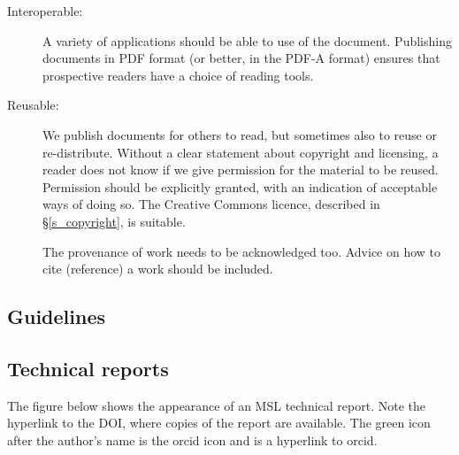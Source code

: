 {\begin{description}
	\item[Interoperable: ] A variety of applications should be able to use of the document. Publishing documents in PDF format (or better, in the PDF-A format) ensures that prospective readers have a choice of reading tools.
	  
	\item[Reusable: ] We publish documents for others to read, but sometimes also to reuse or re-distribute. Without a clear statement about copyright and licensing, a reader does not know if we give permission for the material to be reused. Permission should be explicitly granted, with an indication of acceptable ways of doing so. The Creative Commons licence, described in \S\ref{s_copyright}, is suitable. 

The provenance of work needs to be acknowledged too. Advice on how to cite (reference) a work should be included. 

\end{description}  

\subsection{Guidelines}
\subsection{Technical reports}
The figure below shows the appearance of an MSL technical report. Note the hyperlink to the DOI, where copies of the report are available. The green icon after the author's name is the orcid icon and is a hyperlink to orcid.

}
